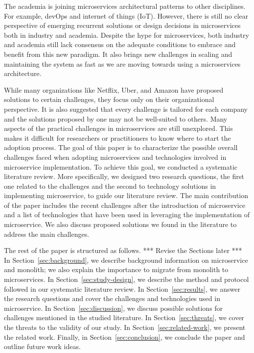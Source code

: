 The academia is joining microservices architectural patterns to other disciplines. For example, devOps and internet of things (IoT)\cite{Osses2019}. However, there is still no clear perspective of emerging recurrent solutions or design decisions in microservices both in industry and academia.\cite{Soldani2018} Despite the hype for microservices, both industry and academia still lack consensus on the adequate conditions to embrace and benefit from this new paradigm.\cite{Dragoni2017} It also brings new challenges in scaling and maintaining the system as fast as we are moving towards using a microservices architecture.

While many organizations like Netflix,\cite{Meshenberg2016} Uber,\cite{Uber} and Amazon\cite{Amazon} have proposed solutions to certain challenges, they focus only on their organizational perspective. It is also suggested that every challenge is tailored for each company and the solutions proposed by one may not be well-suited to others.\cite{Kevin2015} Many aspects of the practical challenges in microservices are still unexplored. This makes it difficult for researchers or practitioners to know where to start the adoption process. The goal of this paper is to characterize the possible overall challenges faced when adopting microservices and technologies involved in microservice implementation. To achieve this goal, we conducted a systematic literature review.\cite{Kitchenham2007} More specifically, we designed two research questions, the first one related to the challenges and the second to technology solutions in implementing microservice, to guide our literature review. 
%
The main contribution of the paper includes the recent challenges after the introduction of microservice and a list of technologies that have been used in leveraging the implementation of microservice. We also discuss proposed solutions we found in the literature to address the main challenges.

The rest of the paper is structured as follows. *** Revise the Sections later *** In Section~\ref{sec:background}, we describe background information on microservice and monolith; we also explain the importance to migrate from monolith to microservices. In Section~\ref{sec:study-design}, we describe the method and protocol followed in our systematic literature review. In Section~\ref{sec:results}, we answer the research questions and cover the challenges and technologies used in microservice. In Section~\ref{sec:discussion}, we discuss possible solutions for challenges mentioned in the studied literature. In Section~\ref{sec:threats}, we cover the threats to the validity of our study. In Section~\ref{sec:related-work}, we present the related work. Finally, in Section~\ref{sec:conclusion}, we conclude the paper and outline future work ideas.



